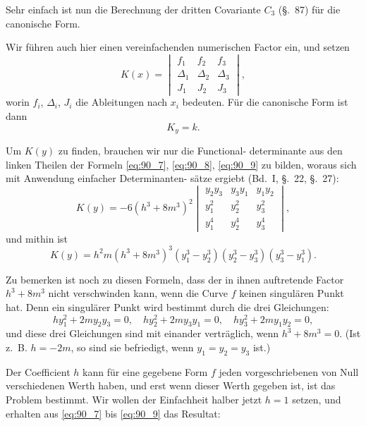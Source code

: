 \documentclass[12pt,a4paper]{article}
\theoremstyle{plain}
\theoremstyle{definition}
\theoremstyle{remark}
\begin{document}
Sehr einfach ist nun die Berechnung der dritten Covariante
$C_3$ (\S.~87) für die canonische Form.

Wir führen auch hier einen vereinfachenden numerischen
Factor ein, und setzen
\begin{equation}\label{eq:90_10}
K(x) = \begin{vmatrix}
f_1 & f_2 & f_3 \\
\Delta_1 & \Delta_2 & \Delta_3 \\
J_1 & J_2 & J_3
\end{vmatrix},
\end{equation}
worin $f_i$, $\Delta_i$, $J_i$ die Ableitungen nach $x_i$ bedeuten. Für die
canonische Form ist dann
\begin{equation}\label{eq:90_11}
K_y = k.
\end{equation}

Um $K(y)$ zu finden, brauchen wir nur die Functional-
determinante aus den linken Theilen der Formeln \eqref{eq:90_7}, \eqref{eq:90_8}, \eqref{eq:90_9} zu
bilden, woraus sich mit Anwendung einfacher Determinanten-
sätze ergiebt (Bd.~I, \S.~22, \S.~27):
\begin{equation*}
K(y) = -6(h^3 + 8m^3)^2
\begin{vmatrix}
y_2 y_3 & y_3 y_1 & y_1 y_2 \\
y_1^2 & y_2^2 & y_3^2 \\
y_1^4 & y_2^4 & y_3^4
\end{vmatrix},
\end{equation*}
und mithin ist
\begin{equation}\label{eq:90_12}
K(y) = h^2 m (h^3 + 8m^3)^3 (y_1^3 - y_2^3)(y_2^3 - y_3^3)(y_3^3 - y_1^3).
\end{equation}

Zu bemerken ist noch zu diesen Formeln, dass der in ihnen
auftretende Factor $h^3 + 8m^3$ nicht verschwinden kann, wenn
die Curve $f$ keinen singulären Punkt hat. Denn ein singulärer
Punkt wird bestimmt durch die drei Gleichungen:
\begin{equation*}
hy_1^2 + 2m y_2 y_3 = 0, \quad hy_2^2 + 2m y_3 y_1 = 0, \quad hy_3^2 + 2m y_1 y_2 = 0,
\end{equation*}
und diese drei Gleichungen sind mit einander verträglich, wenn
$h^3 + 8m^3 = 0$. (Ist z.~B. $h = -2m$, so sind sie befriedigt,
wenn $y_1 = y_2 = y_3$ ist.)

Der Coefficient $h$ kann für eine gegebene Form $f$ jeden
vorgeschriebenen von Null verschiedenen Werth haben, und erst
wenn dieser Werth gegeben ist, ist das Problem bestimmt. Wir
wollen der Einfachheit halber jetzt $h = 1$ setzen, und erhalten
aus \eqref{eq:90_7} bis \eqref{eq:90_9} das Resultat:
\end{document}
